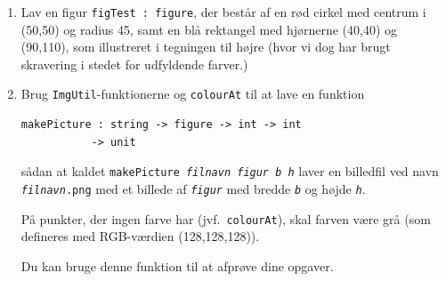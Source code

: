 \documentclass[a4paper,12pt]{article}
\begin{document}
\begin{minipage}{.72\textwidth}
\begin{enumerate}[label=8ø.\arabic*,start=2]

\item Lav en figur \texttt{figTest : figure}, der består af en rød cirkel
  med centrum i (50,50) og radius 45, samt en blå rektangel med
  hjørnerne (40,40) og (90,110), som illustreret i tegningen til
  højre (hvor vi dog har brugt skravering i stedet for udfyldende farver.)

\item Brug \texttt{ImgUtil}-funktionerne og \texttt{colourAt} til at lave en
  funktion

  \vspace{-4mm}
\begin{verbatim}
makePicture : string -> figure -> int -> int
           -> unit
\end{verbatim}
  \vspace{-4mm}

\noindent
sådan at kaldet \texttt{makePicture \emph{filnavn figur b h}} laver en
billedfil ved navn \texttt{\emph{filnavn}.png} med et billede af
\texttt{\emph{figur}} med bredde \texttt{\emph{b}} og højde
\texttt{\emph{h}}.

På punkter, der ingen farve har (jvf.\ \texttt{colourAt}), skal farven
være grå (som defineres med RGB-værdien (128,128,128)).

Du kan bruge denne funktion til at afprøve dine opgaver.
\end{enumerate}
\end{minipage}\hspace{4mm}\begin{minipage}{.23\textwidth}


\end{minipage}
\end{document}
